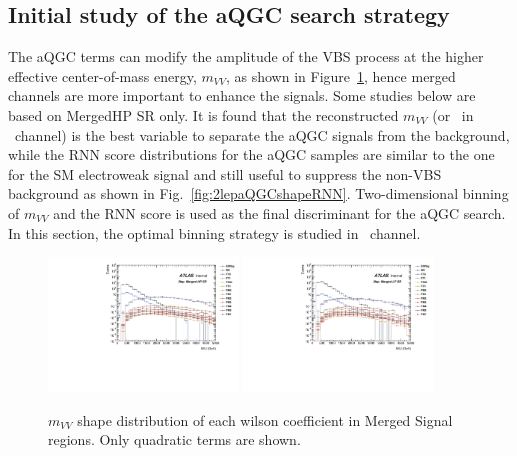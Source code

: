 \subsection{Initial study of the aQGC search strategy}
\label{subsec:binnedsig}

The aQGC terms can modify the amplitude of the VBS process at the higher effective center-of-mass energy, 
$m_{VV}$, as shown in Figure~\ref{fig:2lepaQGCshapeMVV}, hence merged channels are more important to enhance the signals.
Some studies below are based on MergedHP SR only.
It is found that the reconstructed $m_{VV}$ (or \mt\ in \zlep\ channel) is the best variable to separate the aQGC signals from the background,
while the RNN score distributions for the aQGC samples are similar to the one for the SM electroweak signal and still useful 
to suppress the non-VBS background as shown in Fig.~\ref{fig:2lepaQGCshapeRNN}.
Two-dimensional binning of $m_{VV}$ and the RNN score is used as the final discriminant for the aQGC search.
In this section, the optimal binning strategy is studied in \tlep\ channel.

\begin{figure}[]
    \centering
   \includegraphics[width=0.45\textwidth]{figures/aQGC/MllJ_SR_HP_aQGC.pdf}
   \includegraphics[width=0.45\textwidth]{figures/aQGC/MllJ_SR_LP_aQGC.pdf}
    \caption{$m_{VV}$ shape distribution of each wilson coefficient in Merged Signal regions. Only quadratic terms are shown.}
    \label{fig:2lepaQGCshapeMVV}
\end{figure}

